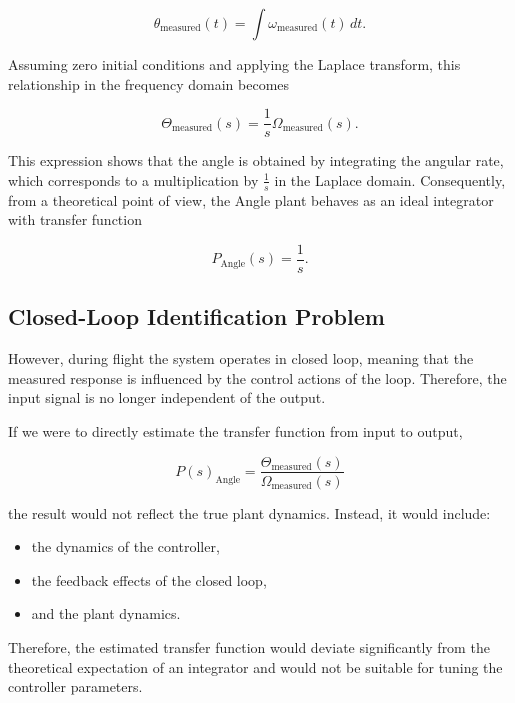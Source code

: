 \documentclass[a4paper,11pt,bibliography=totoc,listof=totoc]{scrreprt}
\begin{document}
\begin{equation}
\theta_{\text{measured}}(t) = \int \omega_{\text{measured}}(t)\, dt.
\end{equation}

Assuming zero initial conditions and applying the Laplace transform, this relationship
in the frequency domain becomes

\begin{equation}
\Theta_{\text{measured}}(s) = \frac{1}{s} \Omega_{\text{measured}}(s).
\end{equation}

This expression shows that the angle is obtained by integrating the angular rate,
which corresponds to a multiplication by $\frac{1}{s}$ in the Laplace domain.
Consequently, from a theoretical point of view, the Angle plant behaves as an ideal integrator with transfer function

\begin{equation}
P_{\text{Angle}}(s) = \frac{1}{s}.
\end{equation}

\subsection{Closed-Loop Identification Problem}

However, during flight the system operates in closed loop, meaning that the measured response is influenced by the control actions of the loop. Therefore, the input signal is no longer independent of the output.

If we were to directly estimate the transfer function from input to output,

\begin{equation}
P(s)_{\text{Angle}} = \frac{\Theta_{\text{measured}}(s)}{\Omega_{\text{measured}}(s)}
\end{equation}

the result would not reflect the true plant dynamics. Instead, it would include:

\begin{itemize}
    \item the dynamics of the controller,
    \item the feedback effects of the closed loop,
    \item and the plant dynamics.
\end{itemize}

Therefore, the estimated transfer function would deviate significantly from the theoretical expectation of an integrator and would not be suitable for tuning the controller parameters.
\end{document}

